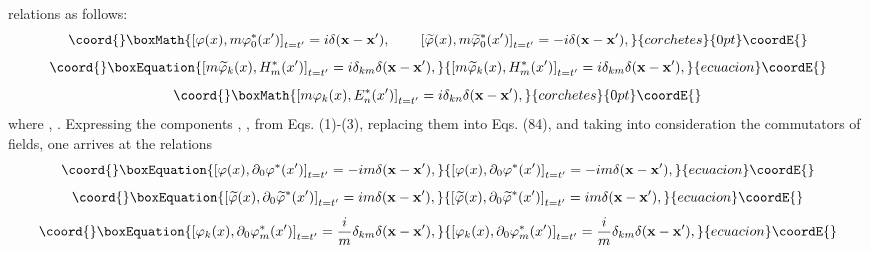\documentclass[a4paper,12pt]{article}
\begin{document}
relations as follows:
\[\coord{}\boxMath{
\left[ \varphi (x),m\varphi _0^{*}(x^{\prime })\right]
_{t=t^{\prime }}=i\delta (\mathbf{x}-\mathbf{x}^{\prime }) ,
\hspace{0.3in}\left[ \widetilde{ \varphi }(x),m\widetilde{\varphi
}_0^{*}(x^{\prime })\right] _{t=t^{\prime }}=-i\delta
(\mathbf{x}-\mathbf{x}^{\prime }) ,
}{corchetes}{0pt}\coordE{}\]
\begin{equation}\coord{}\boxEquation{
\left[ m\widetilde{\varphi }_k(x),H _{m}^{*}(x^{\prime })\right]
_{t=t^{\prime }}=i\delta _{km}\delta
(\mathbf{x}-\mathbf{x}^{\prime }) ,\label{84}
}{
\left[ m\widetilde{\varphi }_k(x),H _{m}^{*}(x^{\prime })\right]
_{t=t^{\prime }}=i\delta _{km}\delta
(\mathbf{x}-\mathbf{x}^{\prime }) ,}{ecuacion}\coordE{}\end{equation}
\[\coord{}\boxMath{
\left[ m\varphi _k(x),E_{n}^{*}(x^{\prime })\right] _{t=t^{\prime
}}=i\delta _{kn}\delta (\mathbf{x}-\mathbf{x}^{\prime }) ,
}{corchetes}{0pt}\coordE{}\]
where \coordHE{}, \coordHE{}. Expressing the components \coordHE{},
\coordHE{}, \myHighlight{$\varphi_{\mu\nu}$}\coordHE{} from Eqs.
(1)-(3), replacing them into Eqs. (84), and taking into
consideration the commutators of fields, one arrives at the
relations
\begin{equation}\coord{}\boxEquation{
\left[ \varphi (x),\partial_0 \varphi^{*}(x^{\prime })\right]
_{t=t^{\prime }}=-im\delta (\mathbf{x}-\mathbf{x}^{\prime }) ,
\label{85}
}{
\left[ \varphi (x),\partial_0 \varphi^{*}(x^{\prime })\right]
_{t=t^{\prime }}=-im\delta (\mathbf{x}-\mathbf{x}^{\prime }) ,
}{ecuacion}\coordE{}\end{equation}
\begin{equation}\coord{}\boxEquation{
\left[ \widetilde{ \varphi }(x),\partial_0 \widetilde{\varphi
}^{*}(x^{\prime })\right] _{t=t^{\prime }}=im\delta
(\mathbf{x}-\mathbf{x}^{\prime }) , \label{86}
}{
\left[ \widetilde{ \varphi }(x),\partial_0 \widetilde{\varphi
}^{*}(x^{\prime })\right] _{t=t^{\prime }}=im\delta
(\mathbf{x}-\mathbf{x}^{\prime }) , }{ecuacion}\coordE{}\end{equation}
\begin{equation}\coord{}\boxEquation{
\left[ \varphi_k(x),\partial_0 \varphi _{m}^{*}(x^{\prime
})\right] _{t=t^{\prime }}=\frac{i}{m}\delta _{km}\delta
(\mathbf{x}-\mathbf{x}^{\prime }) ,\label{87}
}{
\left[ \varphi_k(x),\partial_0 \varphi _{m}^{*}(x^{\prime
})\right] _{t=t^{\prime }}=\frac{i}{m}\delta _{km}\delta
(\mathbf{x}-\mathbf{x}^{\prime }) ,}{ecuacion}\coordE{}\end{equation}
\end{document}

